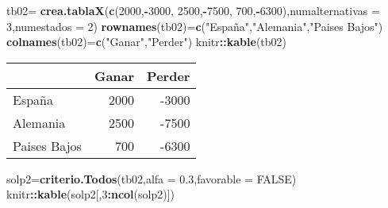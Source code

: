 \documentclass[
]{article}
\newenvironment{Shaded}{\begin{snugshade}}{\end{snugshade}}
\newcommand{\AttributeTok}[1]{\textcolor[rgb]{0.13,0.29,0.53}{#1}}
\newcommand{\ConstantTok}[1]{\textcolor[rgb]{0.56,0.35,0.01}{#1}}
\newcommand{\DecValTok}[1]{\textcolor[rgb]{0.00,0.00,0.81}{#1}}
\newcommand{\FloatTok}[1]{\textcolor[rgb]{0.00,0.00,0.81}{#1}}
\newcommand{\FunctionTok}[1]{\textcolor[rgb]{0.13,0.29,0.53}{\textbf{#1}}}
\newcommand{\NormalTok}[1]{#1}
\newcommand{\OtherTok}[1]{\textcolor[rgb]{0.56,0.35,0.01}{#1}}
\newcommand{\SpecialCharTok}[1]{\textcolor[rgb]{0.81,0.36,0.00}{\textbf{#1}}}
\newcommand{\StringTok}[1]{\textcolor[rgb]{0.31,0.60,0.02}{#1}}
\begin{document}
\newpage

\begin{Shaded}
\begin{Highlighting}[]
\NormalTok{tb02}\OtherTok{=} \FunctionTok{crea.tablaX}\NormalTok{(}\FunctionTok{c}\NormalTok{(}\DecValTok{2000}\NormalTok{,}\SpecialCharTok{{-}}\DecValTok{3000}\NormalTok{,}
                    \DecValTok{2500}\NormalTok{,}\SpecialCharTok{{-}}\DecValTok{7500}\NormalTok{,}
                    \DecValTok{700}\NormalTok{,}\SpecialCharTok{{-}}\DecValTok{6300}\NormalTok{),}\AttributeTok{numalternativas =} \DecValTok{3}\NormalTok{,}\AttributeTok{numestados =} \DecValTok{2}\NormalTok{)}
\FunctionTok{rownames}\NormalTok{(tb02)}\OtherTok{=}\FunctionTok{c}\NormalTok{(}\StringTok{"España"}\NormalTok{,}\StringTok{"Alemania"}\NormalTok{,}\StringTok{"Paises Bajos"}\NormalTok{)}
\FunctionTok{colnames}\NormalTok{(tb02)}\OtherTok{=}\FunctionTok{c}\NormalTok{(}\StringTok{"Ganar"}\NormalTok{,}\StringTok{"Perder"}\NormalTok{)}
\NormalTok{knitr}\SpecialCharTok{::}\FunctionTok{kable}\NormalTok{(tb02)}
\end{Highlighting}
\end{Shaded}

\begin{longtable}[]{@{}lrr@{}}
\toprule\noalign{}
& Ganar & Perder \\
\midrule\noalign{}
\endhead
\bottomrule\noalign{}
\endlastfoot
España & 2000 & -3000 \\
Alemania & 2500 & -7500 \\
Paises Bajos & 700 & -6300 \\
\end{longtable}

\begin{Shaded}
\begin{Highlighting}[]
\NormalTok{solp2}\OtherTok{=}\FunctionTok{criterio.Todos}\NormalTok{(tb02,}\AttributeTok{alfa =} \FloatTok{0.3}\NormalTok{,}\AttributeTok{favorable =} \ConstantTok{FALSE}\NormalTok{)}
\NormalTok{knitr}\SpecialCharTok{::}\FunctionTok{kable}\NormalTok{(solp2[,}\DecValTok{3}\SpecialCharTok{:}\FunctionTok{ncol}\NormalTok{(solp2)])}
\end{Highlighting}
\end{Shaded}
\end{document}
